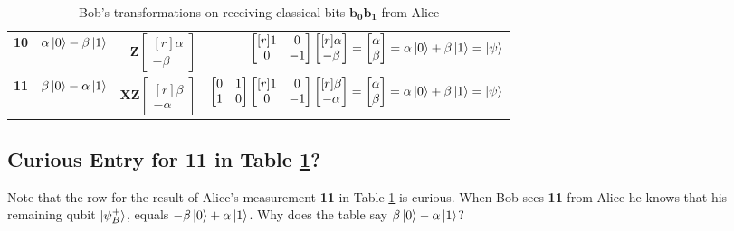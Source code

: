 \documentclass{article}
\theoremstyle{definition}
\begin{document}
\begin{table}[H]
\begin{tabular}{c | c | r | r}
\textbf{10}  & $\alpha \ket{0} - \beta \ket{1}$ & $\mathbf{Z} \begin{bmatrix}[r]   \alpha \\  -\beta  \end{bmatrix}$ & $\begin{bmatrix}[r] 1 & 0  \\ 0 & -1 \end{bmatrix}  \begin{bmatrix}[r] \alpha \\ -\beta \end{bmatrix} 
= \begin{bmatrix} \alpha \\  \beta  \end{bmatrix}  = \alpha \ket{0} + \beta \ket{1} = \ket{\psi}$ \\
\textbf{11}  & $\beta \ket{0} - \alpha \ket{1} $ & $\mathbf{XZ} \begin{bmatrix}[r]  \beta \\  - \alpha  \end{bmatrix}$ & $  \begin{bmatrix} 0 & 1 \\ 1 & 0 \end{bmatrix}  \begin{bmatrix}[r] 1 & 0  \\ 0 & -1 \end{bmatrix} 
  \begin{bmatrix}[r] \beta \\ -  \alpha  \end{bmatrix} = \begin{bmatrix} \alpha \\  \beta  \end{bmatrix} = \alpha \ket{0} + \beta \ket{1} = \ket{\psi}$ \\
\end{tabular}
\caption{Bob's transformations on receiving classical bits $\mathbf{b_0b_1}$ from Alice}
\label{tab:bob}
\end{table}


\subsection{Curious Entry for \textbf{11} in Table \ref{tab:bob}?}
Note that the row for the result of Alice's measurement
\textbf{11} in Table \ref{tab:bob} is curious. When Bob sees
\textbf{11} from Alice he knows that his remaining qubit
$\ket{\psi^{+}_B}$, equals $- \beta \ket{0} + \alpha
\ket{1}$. Why does the table say $\beta \ket{0} - \alpha
\ket{1}$?
\end{document}
